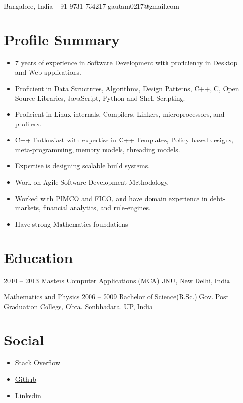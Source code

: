 \personal
    {Bangalore, India}
    {+91 9731 734217}
    {gautam0217@gmail.com}
    
\section{Profile Summary}
\begin{itemize}
    \item{7 years of experience in Software Development with proficiency in Desktop and Web applications.}
    \item{Proficient in Data Structures, Algorithms, Design Patterns, C++, C, Open Source Libraries, JavaScript, Python and Shell Scripting.}
    \item{Proficient in Linux internals, Compilers, Linkers, microprocessors, and profilers.}
    \item{C++ Enthusiast with expertise in C++ Templates, Policy based designs, meta-programming, memory models, threading models.}
    \item{Expertise is designing scalable build systems.}
    \item{Work on Agile Software Development Methodology.}
    \item{Worked with PIMCO and FICO, and have domain experience in debt-markets, financial analytics, and rule-engines.}
    \item{Have strong Mathematics foundations}
\end{itemize}

\section{Education}

\begin{yearlist}

\item {2010 -- 2013}
     {Masters Computer Applications (MCA)}
     {JNU, New Delhi, India}

\item[Mathematics and Physics]{2006 -- 2009}
    {Bachelor of Science(B.Sc.)}
    {Gov. Post Graduation College, Obra, Sonbhadara, UP, India}

\end{yearlist}



\section{Social}
\begin{itemize}
\item \href{https://stackoverflow.com/users/4373992/jha-g}{Stack Overflow}
\item \href{https://github.com/jha-g}{Github}
\item \href{https://www.linkedin.com/in/gautam0217}{Linkedin}
\end{itemize}


